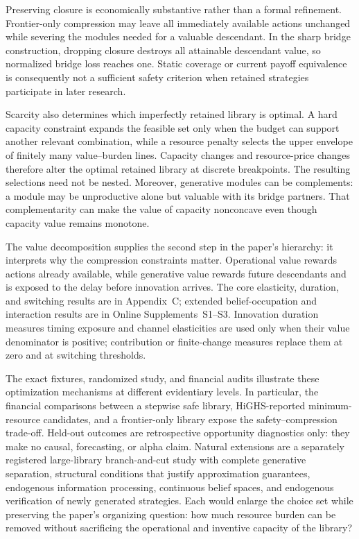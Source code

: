 Preserving closure is economically substantive rather than a formal
refinement. Frontier-only compression may leave all immediately available
actions unchanged while severing the modules needed for a valuable
descendant. In the sharp bridge construction, dropping closure destroys all
attainable descendant value, so normalized bridge loss reaches one. Static
coverage or current payoff equivalence is consequently not a sufficient
safety criterion when retained strategies participate in later research.

Scarcity also determines which imperfectly retained library is optimal. A
hard capacity constraint expands the feasible set only when the budget can
support another relevant combination, while a resource penalty selects the
upper envelope of finitely many value--burden lines. Capacity changes and
resource-price changes therefore alter the optimal retained library at
discrete breakpoints. The resulting selections need not be nested. Moreover,
generative modules can be complements: a module may be unproductive alone
but valuable with its bridge partners. That complementarity can make the
value of capacity nonconcave even though capacity value remains monotone.

The value decomposition supplies the second step in the paper's hierarchy:
it interprets why the compression constraints matter.  Operational value
rewards actions already available, while generative value rewards future
descendants and is exposed to the delay before innovation arrives.  The
core elasticity, duration, and switching results are in Appendix~C; extended
belief-occupation and interaction results are in Online Supplements~S1--S3.
Innovation duration measures timing exposure and channel elasticities are used
only when their value denominator is positive; contribution or finite-change
measures replace them at zero and at switching thresholds.

The exact fixtures, randomized study, and financial audits illustrate these
optimization mechanisms at different evidentiary levels. In particular, the
financial comparisons between a stepwise safe library, HiGHS-reported
minimum-resource candidates, and a frontier-only library expose the
safety--compression trade-off. Held-out outcomes are retrospective opportunity
diagnostics only: they make no causal, forecasting, or alpha claim. Natural
extensions are a separately registered large-library branch-and-cut study with
complete generative separation, structural conditions that justify
approximation guarantees, endogenous information processing, continuous
belief spaces, and endogenous verification of newly generated strategies.
Each would enlarge the choice set while preserving the paper's organizing
question: how much resource burden can be removed without sacrificing the
operational and inventive capacity of the library?
\clearpage

